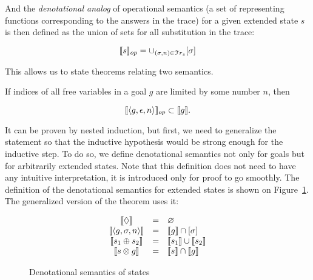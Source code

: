 And the \emph{denotational analog} of operational semantics (a set of representing functions corresponding to the answers in the trace) for a given extended state $s$ is
then defined as the union of sets for all substitution in the trace:

\[
\llbracket{s}\rrbracket_{op} = \cup_{(\sigma, n) \in \mathcal{T}r_{s}} [\sigma]
\]

\begin{comment}
In \textsc{Coq} we again use a proposition instead:

\begin{lstlisting}[language=Coq]
   Definition in_denotational_analog
      (t : trace) (f : repr_fun) : Prop :=
      exists s n, in_stream (Answer s n) t /\
             in_denotational_sem_subst s f.
   Notation "{| t , f |}" := (in_denotational_analog t f).
\end{lstlisting}
\end{comment}

This allows us to state theorems relating two semantics.

\begin{theorem}
\label{OpSemSoundnessThm}
If indices of all free variables in a goal $g$ are limited by some number $n$, then

\[
\llbracket{\left<{g, \epsilon, n}\right>}\rrbracket_{op} \subset \llbracket{g}\rrbracket.
\]
\end{theorem}

It can be proven by nested induction, but first, we need to generalize the statement so that the inductive hypothesis would be strong enough for the inductive step.
To do so, we define denotational semantics not only for goals but for arbitrarily extended states. Note that this definition does not need to have any intuitive
interpretation, it is introduced only for proof to go smoothly. The definition of the denotational semantics for extended states is shown on Figure~\ref{denotational_semantics_of_states}.
The generalized version of the theorem uses it:

\begin{figure}[t]
  \[
  \begin{array}{ccl}
    \llbracket{\Diamond}\rrbracket&=&\varnothing\\
    \llbracket{\left<{g, \sigma, n}\right>}\rrbracket&=&\llbracket{g}\rrbracket\cap[\sigma]\\
    \llbracket{s_1 \oplus s_2}\rrbracket&=&\llbracket{s_1}\rrbracket\cup\llbracket{s_2}\rrbracket\\
    \llbracket{s \otimes g}\rrbracket&=&\llbracket{s}\rrbracket\cap\llbracket{g}\rrbracket\\
  \end{array}
  \]
  \caption{Denotational semantics of states}
  \label{denotational_semantics_of_states}
\end{figure}

